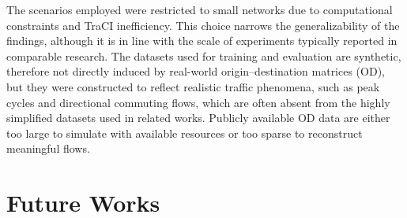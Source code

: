 The scenarios employed were restricted to small networks due to computational constraints and TraCI inefficiency.
This choice narrows the generalizability of the findings, although it is in line with the scale of experiments typically reported in comparable research.
The datasets used for training and evaluation are synthetic, therefore not directly induced by real-world origin–destination matrices (OD), but they were constructed to reflect realistic traffic phenomena, such as peak cycles and directional commuting flows, which are often absent from the highly simplified datasets used in related works.
Publicly available OD data are either too large to simulate with available resources or too sparse to reconstruct meaningful flows.

\section{Future Works}


